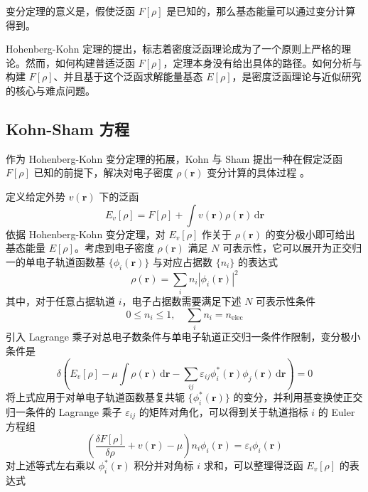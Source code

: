 变分定理的意义是，假使泛函 $F[\rho]$ 是已知的，那么基态能量可以通过变分计算得到。

Hohenberg-Kohn 定理的提出，标志着密度泛函理论成为了一个原则上严格的理论。然而，如何构建普适泛函 $F[\rho]$，定理本身没有给出具体的路径。如何分析与构建 $F[\rho]$、并且基于这个泛函求解能量基态 $E[\rho]$，是密度泛函理论与近似研究的核心与难点问题。

\subsection{Kohn-Sham 方程}

作为 Hohenberg-Kohn 变分定理的拓展，Kohn 与 Sham 提出一种在假定泛函 $F[\rho]$ 已知的前提下，解决对电子密度 $\rho(\bm{r})$ 变分计算的具体过程 \cite{Kohn-Sham.PR.1965}。

定义给定外势 $v (\bm{r})$ 下的泛函
\begin{equation}
  E_{v}[\rho] = F[\rho] + \int v (\bm{r}) \rho (\bm{r}) \, \mathrm{d} \bm{r}
\end{equation}
依据 Hohenberg-Kohn 变分定理，对 $E_{v}[\rho]$ 作关于 $\rho(\bm{r})$ 的变分极小即可给出基态能量 $E[\rho]$。考虑到电子密度 $\rho(\bm{r})$ 满足 $N$ 可表示性，它可以展开为正交归一的单电子轨道函数基 $\{\phi_i(\bm{r})\}$ 与对应占据数 $\{n_i\}$ 的表达式
\begin{equation}
  \rho(\bm{r}) = \sum_i n_i |\phi_i(\bm{r})|^2
\end{equation}
其中，对于任意占据轨道 $i$，电子占据数需要满足下述 $N$ 可表示性条件
\begin{equation}
  0 \leqslant n_i \leqslant 1, \quad \sum_i n_i = n_\mathrm{elec}
\end{equation}
引入 Lagrange 乘子对总电子数条件与单电子轨道正交归一条件作限制，变分极小条件是
\begin{equation}
  \delta \left( E_{v}[\rho] - \mu \int \rho(\bm{r}) \, \mathrm{d} \bm{r} - \sum_{ij} \varepsilon_{ij} \phi_i^*(\bm{r}) \phi_j(\bm{r})  \, \mathrm{d} \bm{r} \right) = 0
\end{equation}
将上式应用于对单电子轨道函数基复共轭 $\{\phi_i^*(\bm{r})\}$ 的变分，并利用基变换使正交归一条件的 Lagrange 乘子 $\varepsilon_{ij}$ 的矩阵对角化，可以得到关于轨道指标 $i$ 的 Euler 方程组
\begin{equation}
  \label{eq.frac-ks}
  \left( \frac{\delta F[\rho]}{\delta \rho} + v(\bm{r}) - \mu \right) n_i \phi_i (\bm{r}) = \varepsilon_i \phi_i (\bm{r})
\end{equation}
对上述等式左右乘以 $\phi_i^* (\bm{r})$ 积分并对角标 $i$ 求和，可以整理得泛函 $E_{v}[\rho]$ 的表达式
